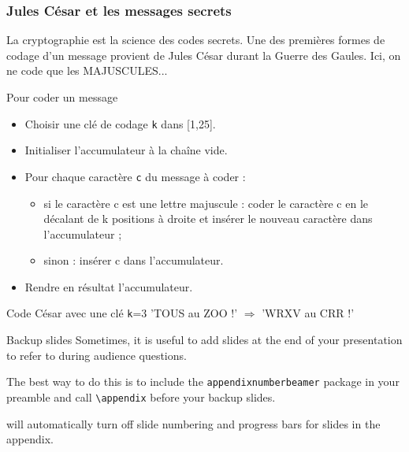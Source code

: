 \documentclass[10pt]{beamer}
\begin{document}
\begin{frame}
  \frametitle{Jules César et les messages secrets}
  La cryptographie est la science des codes secrets.
  Une des premières formes de codage d'un message provient de Jules César durant la Guerre des Gaules.
  Ici, on ne code que les MAJUSCULES...

  \begin{block}{Pour coder un message}
    \begin{itemize}
    \item Choisir une clé de codage \texttt{k} dans [1,25].
    \item Initialiser l'accumulateur à la chaîne vide.
    \item Pour chaque caractère \texttt{c} du message à coder :
      \begin{itemize}
      \item si le caractère c est une lettre majuscule : coder le caractère c en le décalant de k positions à droite et insérer le nouveau caractère dans l'accumulateur ;
      \item sinon : insérer c dans l'accumulateur.
      \end{itemize}
    \item Rendre en résultat l'accumulateur.

    \end{itemize}
  \end{block}

  \begin{exampleblock}{Code César avec une clé \texttt{k}=3}
    'TOUS au ZOO !'  $\Longrightarrow$ 'WRXV au CRR !'
  \end{exampleblock}
\end{frame}


\questionSlide

 \appendix
 \backupSlides

\begin{frame}[fragile]{Backup slides}
  Sometimes, it is useful to add slides at the end of your presentation to
  refer to during audience questions.

  The best way to do this is to include the \verb|appendixnumberbeamer|
  package in your preamble and call \verb|\appendix| before your backup slides.

  will automatically turn off slide numbering and progress bars for
  slides in the appendix.
\end{frame}







\end{document}
